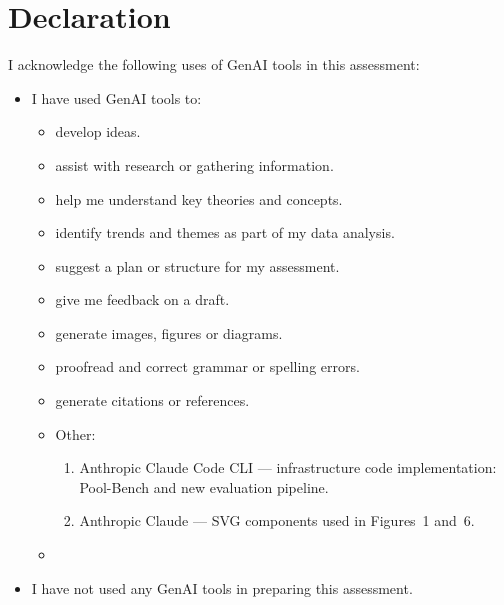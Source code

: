 \documentclass[11pt,a4paper]{article}
\begin{document}
%
\newpage
\thispagestyle{empty}
\section*{Declaration}
I acknowledge the following uses of GenAI tools in this assessment:


\begin{itemize}[label={\ $\square$\ }, leftmargin=*]


  \item[{\ $\text{\rlap{$\times$}}\square$\ }] I have used GenAI tools to:
  \begin{itemize}[label={\ $\square$\ }, leftmargin=*]
    \item[{\ $\text{\rlap{$\times$}}\square$\ }] develop ideas.
    \item[{\ $\text{\rlap{$\times$}}\square$\ }] assist with research or gathering information.
    \item help me understand key theories and concepts.
    \item identify trends and themes as part of my data analysis.
    \item suggest a plan or structure for my assessment.
    \item[{\ $\text{\rlap{$\times$}}\square$\ }] give me feedback on a draft.
    \item[{\ $\text{\rlap{$\times$}}\square$\ }] generate images, figures or diagrams.
    \item[{\ $\text{\rlap{$\times$}}\square$\ }] proofread and correct grammar or spelling errors.
    \item[{\ $\text{\rlap{$\times$}}\square$\ }] generate citations or references.
    \item[{\ $\text{\rlap{$\times$}}\square$\ }] Other:
    \begin{enumerate}[leftmargin=1.6em]
      \item Anthropic Claude Code CLI --- infrastructure code implementation: Pool-Bench and new evaluation pipeline.
      \item Anthropic Claude --- SVG components used in Figures~1 and~6.
    \end{enumerate}
    \item[]
  \end{itemize}

  \item I have not used any GenAI tools in preparing this assessment.
\end{itemize}
\end{document}
